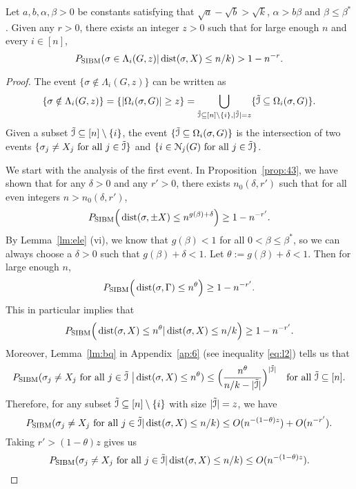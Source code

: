 \documentclass{article}
\begin{document}
\begin{lemma} \label{lm:us}
Let $a,b,\alpha,\beta> 0$ be constants satisfying that $\sqrt{a}-\sqrt{b} > \sqrt{k}$, $\alpha>b\beta$ and $\beta\le \beta^\ast$.
Given any $r>0$, there exists an integer $z>0$ such that for large enough $n$ and every $i\in[n]$, 
\begin{equation} \label{eq:zr}
P_{\operatorname{SIBM}} (\sigma\in \Lambda_i(G, z)
| \operatorname{dist}(\sigma, X) \le n/k)
> 1 - n^{-r} .
\end{equation}
\end{lemma}
\begin{proof}
The event $\{\sigma\notin \Lambda_i(G, z) \}$ can be written as
\begin{equation} \label{eq:lei}
\{\sigma\notin \Lambda_i(G, z) \}
=\{|\Omega_i(\sigma,G)| \ge z \}
=\bigcup_{\tilde{\mathcal{I}}\subseteq[n]\setminus\{i\}, |\tilde{\mathcal{I}}| = z} \{\tilde{\mathcal{I}} \subseteq \Omega_i(\sigma,G)\} .
\end{equation}
Given a subset $\tilde{\mathcal{I}}\subseteq[n]\setminus\{i\}$,
the event $\{\tilde{\mathcal{I}} \subseteq \Omega_i(\sigma,G) \}$ is the intersection of two events $\{\sigma_j \neq X_j \text{~for all~} j\in \tilde{\mathcal{I}}\}$ and $\{i\in\mathcal{N}_j(G) \text{~for all~} j\in \tilde{\mathcal{I}}\}$.

We start with the analysis of the first event.
In Proposition~\ref{prop:43}, we have shown that
for any $\delta>0$ and any $r'>0$, there exists $n_0(\delta, r')$ such that for all even integers $n>n_0(\delta, r')$,
$$ 
P_{\operatorname{SIBM}} \Big(\operatorname{dist}(\sigma,\pm X) \le n^{g(\beta)+\delta}
 \Big) \ge 1- n^{-r'} .
$$
By Lemma~\ref{lm:ele} (vi), we know that $g(\beta)<1$ for all $0<\beta\le\beta^\ast$, so we can always choose a $\delta>0$ such that $g(\beta)+\delta<1$.
Let $\theta:=g(\beta)+\delta<1$. Then for large enough $n$,
$$
P_{\operatorname{SIBM}} \Big(\operatorname{dist}(\sigma, \Gamma) \le n^{\theta} \Big) \ge 1- n^{-r'} .
$$
This in particular implies that
$$
P_{\operatorname{SIBM}} \Big(\operatorname{dist}(\sigma, X) \le n^{\theta} | \operatorname{dist}(\sigma, X) \le n/k
\Big) \ge 1- n^{-r'} .
$$
Moreover, Lemma~\ref{lm:bq} in Appendix~\ref{ap:6} (see inequality \eqref{eq:l2}) tells us that
$$
 P_{\operatorname{SIBM}}(\sigma_j \neq X_j \text{~for all~}  j\in\tilde{\mathcal{I}}
~\big| \operatorname{dist}(\sigma,X) \le n^\theta) \le \Big(\frac{n^\theta}{n/k-|\tilde{\mathcal{I}}|}
\Big)^{|\tilde{\mathcal{I}}|}
\quad \text{for all~} \tilde{\mathcal{I}}\subseteq [n] .
$$
Therefore, for any subset $\tilde{\mathcal{I}}\subseteq[n]\setminus\{i\}$ with size $|\tilde{\mathcal{I}}|=z$, we have
$$
P_{\operatorname{SIBM}}(\sigma_j \neq X_j \text{~for all~} j\in \tilde{\mathcal{I}}
| \operatorname{dist}(\sigma, X) \le n/k )
\le O(n^{-(1-\theta) z}) + O(n^{-r'}) . 
$$
Taking $r'>(1-\theta) z$ gives us
\begin{equation} \label{eq:gr}
P_{\operatorname{SIBM}}(\sigma_j \neq X_j \text{~for all~} j\in \tilde{\mathcal{I}}
| \operatorname{dist}(\sigma, X) \le n/k )
\le O(n^{-(1-\theta) z}) . 
\end{equation}


\end{proof}
\end{document}
